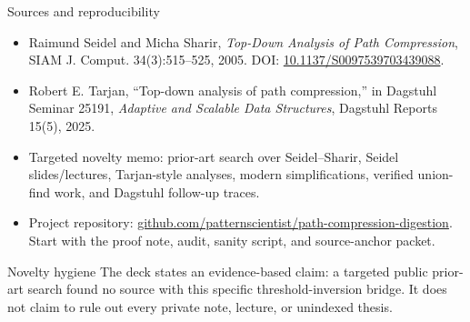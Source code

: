 \documentclass[aspectratio=169,11pt]{beamer}
\begin{document}
\begin{frame}{Sources and reproducibility}
\small
\begin{itemize}
  \item Raimund Seidel and Micha Sharir, \textit{Top-Down Analysis of Path Compression}, SIAM J. Comput. 34(3):515--525, 2005. DOI: \href{https://doi.org/10.1137/S0097539703439088}{10.1137/S0097539703439088}.
  \item Robert E. Tarjan, ``Top-down analysis of path compression,'' in Dagstuhl Seminar 25191, \textit{Adaptive and Scalable Data Structures}, Dagstuhl Reports 15(5), 2025.
  \item Targeted novelty memo: prior-art search over Seidel--Sharir, Seidel slides/lectures, Tarjan-style analyses, modern simplifications, verified union-find work, and Dagstuhl follow-up traces.
  \item Project repository: \href{https://github.com/patternscientist/path-compression-digestion}{github.com/patternscientist/path-compression-digestion}. Start with the proof note, audit, sanity script, and source-anchor packet.
\end{itemize}
\vfill
\begin{block}{Novelty hygiene}
The deck states an evidence-based claim: a targeted public prior-art search found no source with this specific threshold-inversion bridge. It does not claim to rule out every private note, lecture, or unindexed thesis.
\end{block}
\end{frame}
\end{document}
